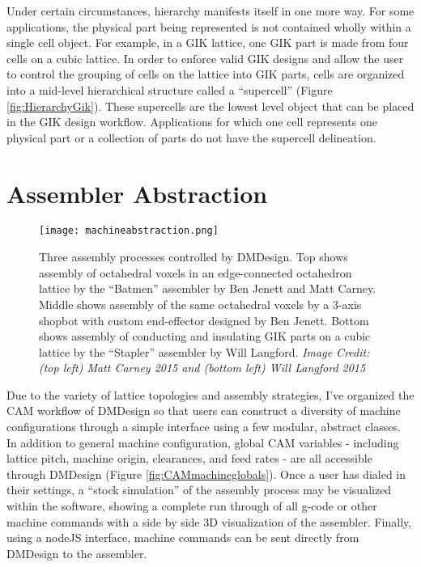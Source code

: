 {Under certain circumstances, hierarchy manifests itself in one more way.  For some applications, the physical part being represented is not contained wholly within a single cell object.  For example, in a GIK lattice, one GIK part is made from four cells on a cubic lattice.  In order to enforce valid GIK designs and allow the user to control the grouping of cells on the lattice into GIK parts, cells are organized into a mid-level hierarchical structure called a ``supercell'' (Figure \ref{fig:HierarchyGik}).  These supercells are the lowest level object that can be placed in the GIK design workflow.  Applications for which one cell represents one physical part or a collection of parts do not have the supercell delineation.

\section{Assembler Abstraction}\label{sec:CAM}

\begin{figure}
  \texttt{[image: machineabstraction.png]}
  \caption{Three assembly processes controlled by DMDesign.  Top shows assembly of octahedral voxels in an edge-connected octahedron lattice by the ``Batmen'' assembler by Ben Jenett and Matt Carney.  Middle shows assembly of the same octahedral voxels by a 3-axis shopbot with custom end-effector designed by Ben Jenett.  Bottom shows assembly of conducting and insulating GIK parts on a cubic lattice by the ``Stapler'' assembler by Will Langford.  \textit{Image Credit: (top left) Matt Carney 2015 and (bottom left) Will Langford 2015}}
  \label{fig:machineabstraction}
\end{figure}

Due to the variety of lattice topologies and assembly strategies, I've organized the CAM workflow of DMDesign so that users can construct a diversity of machine configurations through a simple interface using a few modular, abstract classes.  In addition to general machine configuration, global CAM variables - including lattice pitch, machine origin, clearances, and feed rates - are all accessible through DMDesign (Figure \ref{fig:CAMmachineglobals}).  Once a user has dialed in their settings, a ``stock simulation'' of the assembly process may be visualized within the software, showing a complete run through of all g-code or other machine commands with a side by side 3D visualization of the assembler.  Finally, using a nodeJS interface, machine commands can be sent directly from DMDesign to the assembler.\\

}
